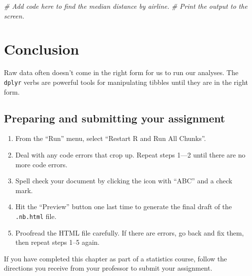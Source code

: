 \documentclass[
]{book}
\newenvironment{Shaded}{\begin{snugshade}}{\end{snugshade}}
\newcommand{\CommentTok}[1]{\textcolor[rgb]{0.56,0.35,0.01}{\textit{#1}}}
\providecommand{\tightlist}{%
  \setlength{\itemsep}{0pt}\setlength{\parskip}{0pt}}
\begin{document}
\begin{Shaded}
\begin{Highlighting}[]
\CommentTok{\# Add code here to find the median distance by airline.}
\CommentTok{\# Print the output to the screen.}
\end{Highlighting}
\end{Shaded}

\hypertarget{manipulating-conclusion}{%
\section{Conclusion}\label{manipulating-conclusion}}

Raw data often doesn't come in the right form for us to run our analyses. The \texttt{dplyr} verbs are powerful tools for manipulating tibbles until they are in the right form.

\hypertarget{manipulating-prep}{%
\subsection{Preparing and submitting your assignment}\label{manipulating-prep}}

\begin{enumerate}
\def\labelenumi{\arabic{enumi}.}
\tightlist
\item
  From the ``Run'' menu, select ``Restart R and Run All Chunks''.
\item
  Deal with any code errors that crop up. Repeat steps 1---2 until there are no more code errors.
\item
  Spell check your document by clicking the icon with ``ABC'' and a check mark.
\item
  Hit the ``Preview'' button one last time to generate the final draft of the \texttt{.nb.html} file.
\item
  Proofread the HTML file carefully. If there are errors, go back and fix them, then repeat steps 1--5 again.
\end{enumerate}

If you have completed this chapter as part of a statistics course, follow the directions you receive from your professor to submit your assignment.

  
\end{document}
